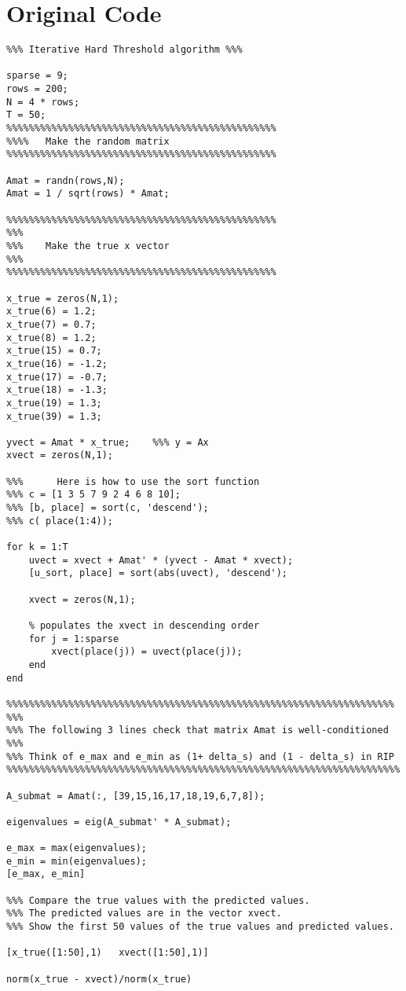 \documentclass[11pt]{article}
\begin{document}
\section{Original Code}
\label{sec:org1004933}
\begin{verbatim}
%%% Iterative Hard Threshold algorithm %%%

sparse = 9;
rows = 200;
N = 4 * rows;
T = 50;
%%%%%%%%%%%%%%%%%%%%%%%%%%%%%%%%%%%%%%%%%%%%%%%%
%%%%   Make the random matrix
%%%%%%%%%%%%%%%%%%%%%%%%%%%%%%%%%%%%%%%%%%%%%%%%

Amat = randn(rows,N);
Amat = 1 / sqrt(rows) * Amat;

%%%%%%%%%%%%%%%%%%%%%%%%%%%%%%%%%%%%%%%%%%%%%%%%
%%%
%%%    Make the true x vector
%%%
%%%%%%%%%%%%%%%%%%%%%%%%%%%%%%%%%%%%%%%%%%%%%%%%

x_true = zeros(N,1);
x_true(6) = 1.2;
x_true(7) = 0.7;
x_true(8) = 1.2;
x_true(15) = 0.7;
x_true(16) = -1.2;
x_true(17) = -0.7;
x_true(18) = -1.3;
x_true(19) = 1.3;
x_true(39) = 1.3;

yvect = Amat * x_true;    %%% y = Ax
xvect = zeros(N,1);

%%%      Here is how to use the sort function
%%% c = [1 3 5 7 9 2 4 6 8 10];
%%% [b, place] = sort(c, 'descend');
%%% c( place(1:4));

for k = 1:T
    uvect = xvect + Amat' * (yvect - Amat * xvect);
    [u_sort, place] = sort(abs(uvect), 'descend');

    xvect = zeros(N,1);

    % populates the xvect in descending order
    for j = 1:sparse
        xvect(place(j)) = uvect(place(j));
    end
end

%%%%%%%%%%%%%%%%%%%%%%%%%%%%%%%%%%%%%%%%%%%%%%%%%%%%%%%%%%%%%%%%%%%%%
%%%
%%% The following 3 lines check that matrix Amat is well-conditioned
%%%
%%% Think of e_max and e_min as (1+ delta_s) and (1 - delta_s) in RIP
%%%%%%%%%%%%%%%%%%%%%%%%%%%%%%%%%%%%%%%%%%%%%%%%%%%%%%%%%%%%%%%%%%%%%%

A_submat = Amat(:, [39,15,16,17,18,19,6,7,8]);

eigenvalues = eig(A_submat' * A_submat);

e_max = max(eigenvalues);
e_min = min(eigenvalues);
[e_max, e_min]

%%% Compare the true values with the predicted values.
%%% The predicted values are in the vector xvect.
%%% Show the first 50 values of the true values and predicted values.

[x_true([1:50],1)   xvect([1:50],1)]

norm(x_true - xvect)/norm(x_true)
\end{verbatim}
\end{document}
